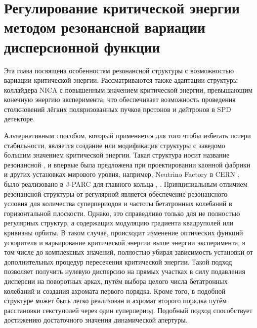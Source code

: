 
	\chapter{Регулирование критической энергии методом резонансной вариации дисперсионной функции}\label{ch:resonant}

\par Эта глава посвящена особенностям резонансной структуры с возможностью вариации критической энергии. Рассматриваются также адаптации структуры коллайдера NICA с повышенным значением критической энергии, превышающим конечную энергию эксперимента, что обеспечивает возможность проведения столкновений лёгких поляризованных пучков протонов и дейтронов в SPD детекторе.

\par	Альтернативным способом, который применяется для того чтобы избегать потери стабильности, является создание или модификация структуры с заведомо большим значением критической энергии. Такая структура носит название резонансной \cite{senichev:resonant}, \cite{senichev:construction} и впервые была предложена при проектировании каонной фабрики \cite{kaon_tr} и других установках мирового уровня, например, Neutrino Factory в CERN \cite{neutrino_tr}, было реализовано в J-PARC для главного кольца \cite{JHP_tr}, \cite{J-PARK_tr}. Принципиальным отличием резонансной структуры от регулярной является обеспечение резонансного условия для количества суперпериодов и частоты бетатронных колебаний в горизонтальной плоскости. Однако, это справедливо только для не полностью регулярных структур, а содержащих модуляцию градиента квадруполей или кривизны орбиты. В таком случае, происходит изменение оптических функций ускорителя и варьирование критической энергии выше энергии эксперимента, в том числе до комплексных значений, полностью убирая зависимость установки от дополнительных процедур пересечения критической энергии. Такой подход позволяет получить нулевую дисперсию на прямых участках в силу подавления дисперсии на поворотных арках, путём выбора целого числа бетатронных колебаний и создания ахромата первого порядка. Кроме того, в подобной структуре может быть легко реализован и ахромат второго порядка путём расстановки секступолей через один суперпериод. Подобный подход способствует достижению достаточного значения динамической апертуры.

